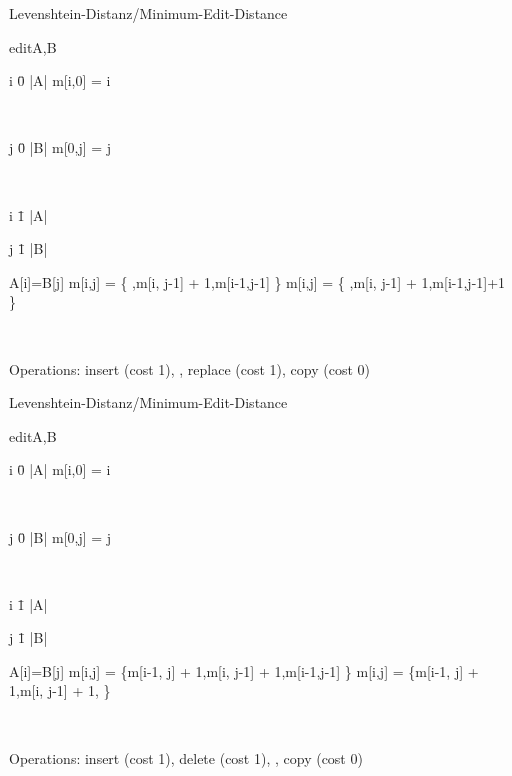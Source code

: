 \documentclass[aspectratio=169]{beamer}
\begin{document}
\begin{frame}{Levenshtein-Distanz/Minimum-Edit-Distance}
\begin{algorithm}{edit}{A,B}
\begin{FOR}
{i \= 0 \TO |A|}
m[i,0] = i
\end{FOR}\\
\begin{FOR}
{j \= 0 \TO |B|}
m[0,j] = j
\end{FOR}\\
\begin{FOR}
{i \= 1 \TO |A|}
\begin{FOR}
{j \= 1 \TO |B|}
\begin{IF}{A[i]=B[j]}
m[i,j] = \min\{ ,m[i, j\mbox{-}1] \mbox{+} 1,m[i\mbox{-}1,j\mbox{-}1] \}
\ELSE
m[i,j] = \min\{ ,m[i, j\mbox{-}1] \mbox{+} 1,m[i\mbox{-}1,j\mbox{-}1]\mbox{+}1 \}
\end{IF}
\end{FOR}
\end{FOR}\\
\end{algorithm}
Operations: insert (cost 1), , replace (cost 1), copy (cost 0)
\end{frame}

\begin{frame}{Levenshtein-Distanz/Minimum-Edit-Distance}
\begin{algorithm}{edit}{A,B}
\begin{FOR}
{i \= 0 \TO |A|}
m[i,0] = i
\end{FOR}\\
\begin{FOR}
{j \= 0 \TO |B|}
m[0,j] = j
\end{FOR}\\
\begin{FOR}
{i \= 1 \TO |A|}
\begin{FOR}
{j \= 1 \TO |B|}
\begin{IF}{A[i]=B[j]}
m[i,j] = \min\{m[i\mbox{-}1, j] \mbox{+} 1,m[i, j\mbox{-}1] \mbox{+} 1,m[i\mbox{-}1,j\mbox{-}1] \}
\ELSE
m[i,j] = \min\{m[i\mbox{-}1, j] \mbox{+} 1,m[i, j\mbox{-}1] \mbox{+} 1,  \}
\end{IF}
\end{FOR}
\end{FOR}\\
\end{algorithm}
Operations: insert (cost 1), delete (cost 1), , copy (cost 0)
\end{frame}
\end{document}
